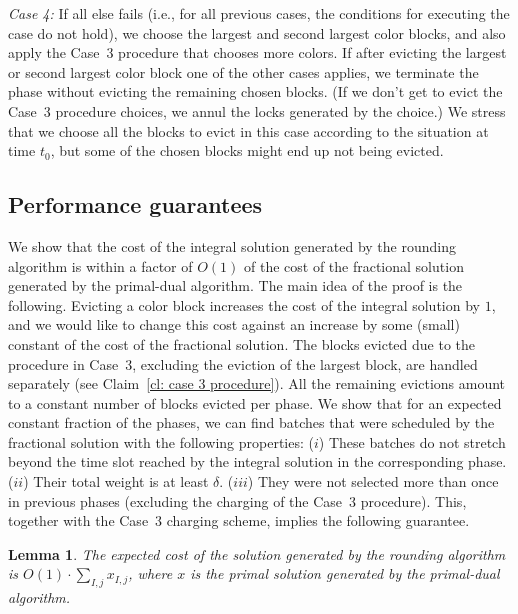 \documentclass[12pt]{article}
\newtheorem{lemma}[theorem]{Lemma}
\begin{document}
{\em Case 4:}\/ If all else fails (i.e., for all previous
cases, the conditions for executing the case do not
hold), we choose the largest
and second largest color blocks, and also apply the
Case~3 procedure that chooses more colors. If after 
evicting the largest or second largest color block one 
of the other cases applies, 
we terminate the phase without evicting the remaining
chosen blocks. (If we don't get to evict the Case~3
procedure choices, we annul the locks generated by 
the choice.) We stress that we choose all the blocks to 
evict in this case according to the situation at time $t_0$,
but some of the chosen blocks might end up not being
evicted.




\subsection{Performance guarantees}

We show that the cost of the integral solution generated
by the rounding algorithm is within a factor of $O(1)$ of
the cost of the fractional solution generated by the
primal-dual algorithm. The main idea of the proof is the
following. Evicting a color block increases the cost of the
integral solution by $1$, and we would like to change this
cost against an increase by some (small) constant of the
cost of the fractional solution. The blocks evicted due to 
the procedure in Case~3, excluding the eviction of the largest 
block, are handled separately (see Claim~\ref{cl: case 3 procedure}).
All the remaining evictions amount to a constant number of
blocks evicted per phase. We show that for an expected
constant fraction of the phases, we can find batches that
were scheduled by the fractional solution with the following
properties: ($i$) These batches do not stretch beyond the time
slot reached by the integral solution in the corresponding phase.
($ii$) Their total weight is at least $\delta$. ($iii$) They were
not selected more than once in previous phases (excluding the 
charging of the Case~3 procedure). This, together with the
Case~3 charging scheme, implies the following guarantee.
\begin{lemma}\label{lm: rounding main}
The expected cost of the solution generated by the
rounding algorithm is $O(1)\cdot \sum_{I,j} x_{I,j}$,
where $x$ is the primal solution generated by the
primal-dual algorithm.
\end{lemma}
\end{document}
